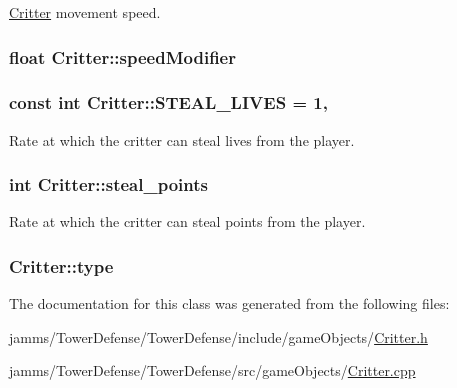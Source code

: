 \hyperlink{class_critter}{Critter} movement speed. 

\hypertarget{class_critter_ad53189c28d3f392ea8d1f1796e7c0744}{
\subsubsection[{speed\+Modifier}]{\setlength{\rightskip}{0pt plus 5cm}float Critter\+::speed\+Modifier\hspace{0.3cm}{\ttfamily [protected]}}}\label{class_critter_ad53189c28d3f392ea8d1f1796e7c0744}
\hypertarget{class_critter_a1324eb838f1790e904a0b82c9ceed173}{
\subsubsection[{S\+T\+E\+A\+L\+\_\+\+L\+I\+V\+E\+S}]{\setlength{\rightskip}{0pt plus 5cm}const int Critter\+::\+S\+T\+E\+A\+L\+\_\+\+L\+I\+V\+E\+S = 1\hspace{0.3cm}{\ttfamily [static]}, {\ttfamily [protected]}}}\label{class_critter_a1324eb838f1790e904a0b82c9ceed173}


Rate at which the critter can steal lives from the player. 

\hypertarget{class_critter_ad2b5b3ee8a0b69d4023f60cfb9f26a6a}{
\subsubsection[{steal\+\_\+points}]{\setlength{\rightskip}{0pt plus 5cm}int Critter\+::steal\+\_\+points\hspace{0.3cm}{\ttfamily [protected]}}}\label{class_critter_ad2b5b3ee8a0b69d4023f60cfb9f26a6a}


Rate at which the critter can steal points from the player. 

\hypertarget{class_critter_ac59fc8262aaffbdae6f2823460b58737}{
\subsubsection[{type}]{ Critter\+::type\hspace{0.3cm}{\ttfamily [protected]}}}\label{class_critter_ac59fc8262aaffbdae6f2823460b58737}


The documentation for this class was generated from the following files\+:\begin{DoxyCompactItemize}
\item 
jamms/\+Tower\+Defense/\+Tower\+Defense/include/game\+Objects/\hyperlink{_critter_8h}{Critter.\+h}\item 
jamms/\+Tower\+Defense/\+Tower\+Defense/src/game\+Objects/\hyperlink{_critter_8cpp}{Critter.\+cpp}\end{DoxyCompactItemize}
